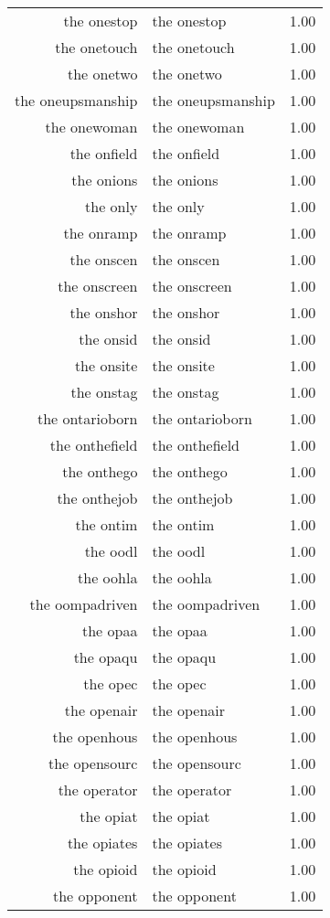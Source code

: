 \begin{table}[ht]
\begin{tabular}{rlr}
  the onestop & the onestop & 1.00 \\ 
  the onetouch & the onetouch & 1.00 \\ 
  the onetwo & the onetwo & 1.00 \\ 
  the oneupsmanship & the oneupsmanship & 1.00 \\ 
  the onewoman & the onewoman & 1.00 \\ 
  the onfield & the onfield & 1.00 \\ 
  the onions & the onions & 1.00 \\ 
  the only & the only & 1.00 \\ 
  the onramp & the onramp & 1.00 \\ 
  the onscen & the onscen & 1.00 \\ 
  the onscreen & the onscreen & 1.00 \\ 
  the onshor & the onshor & 1.00 \\ 
  the onsid & the onsid & 1.00 \\ 
  the onsite & the onsite & 1.00 \\ 
  the onstag & the onstag & 1.00 \\ 
  the ontarioborn & the ontarioborn & 1.00 \\ 
  the onthefield & the onthefield & 1.00 \\ 
  the onthego & the onthego & 1.00 \\ 
  the onthejob & the onthejob & 1.00 \\ 
  the ontim & the ontim & 1.00 \\ 
  the oodl & the oodl & 1.00 \\ 
  the oohla & the oohla & 1.00 \\ 
  the oompadriven & the oompadriven & 1.00 \\ 
  the opaa & the opaa & 1.00 \\ 
  the opaqu & the opaqu & 1.00 \\ 
  the opec & the opec & 1.00 \\ 
  the openair & the openair & 1.00 \\ 
  the openhous & the openhous & 1.00 \\ 
  the opensourc & the opensourc & 1.00 \\ 
  the operator & the operator & 1.00 \\ 
  the opiat & the opiat & 1.00 \\ 
  the opiates & the opiates & 1.00 \\ 
  the opioid & the opioid & 1.00 \\ 
  the opponent & the opponent & 1.00 \\ 

\end{tabular}
\end{table}
